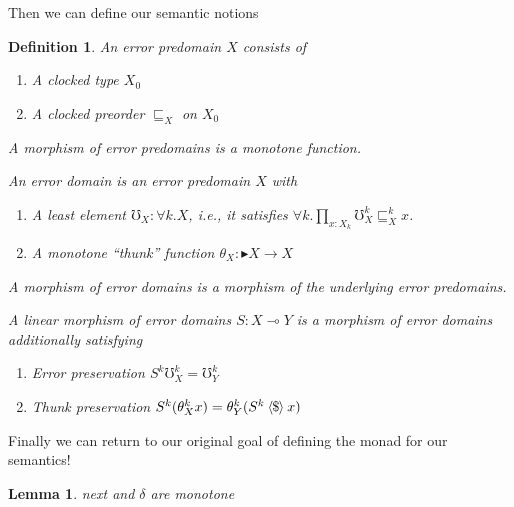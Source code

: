 \documentclass{article}
\newtheorem{definition}{Definition}[section]
\newtheorem{lemma}{Lemma}[section]
\newcommand{\later}{{\blacktriangleright}}
\newcommand{\kerrp}[2]{\mho^{#1}_{#2}}
\newcommand{\err}{\mho}
\newcommand{\kltp}[2]{\mathrel{\sqsubseteq^{#1}_{#2}}}
\newcommand{\ltgt}[1]{\mathbin{\langle\mspace{-1mu}#1\mspace{-1mu}\rangle}}
\newcommand{\fmap}{\ltgt{\$}}
\begin{document}
Then we can define our semantic notions
\begin{definition}
  An \emph{error predomain} $X$ consists of
  \begin{enumerate}
  \item A clocked type $X_0$
  \item A clocked preorder $\kltp {} X$ on $X_0$ 
  \end{enumerate}
  A morphism of error predomains is a monotone function.

  An \emph{error domain} is an error predomain $X$ with
  \begin{enumerate}
  \item A least element $\kerrp {} X : \forall k. X$, i.e., it
    satisfies $\forall k. \prod_{x:X_k} \kerrp k X \kltp k X x$.
  \item A monotone ``thunk'' function $\theta_X : \later X \to X$
  \end{enumerate}
  A morphism of error domains is a morphism of the underlying error
  predomains.

  A \emph{linear} morphism of error domains $S : X \multimap Y$ is a
  morphism of error domains additionally satisfying
  \begin{enumerate}
  \item Error preservation $S^k \err^k_X = \err^k_Y$
  \item Thunk preservation $S^k (\theta^k_X x) = \theta^k_Y (S^k \fmap x)$
  \end{enumerate}
\end{definition}

Finally we can return to our original goal of defining the monad for our semantics!
%

\begin{lemma}
  next and $\delta$ are monotone
\end{lemma}
\end{document}
